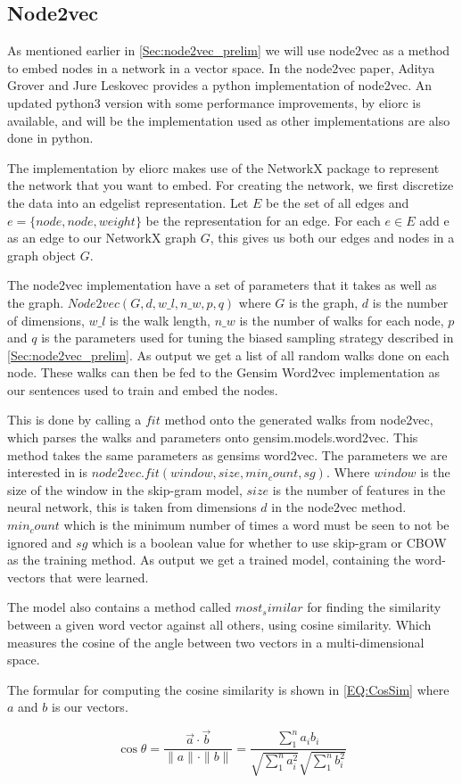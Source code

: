 \subsection{Node2vec}
\label{Sec:n2v_implementation}
As mentioned earlier in \ref{Sec:node2vec_prelim} we will use node2vec as a method to embed nodes in a network in a vector space. In the node2vec paper, Aditya Grover and Jure Leskovec provides a python implementation of node2vec. An updated python3 version with some performance improvements, by eliorc\cite{n2v.eliorc} is available, and will be the implementation used as other implementations are also done in python.

The implementation by eliorc makes use of the NetworkX package to represent the network that you want to embed. For creating the network, we first discretize the data into an edgelist representation. Let $E$ be the set of all edges and $e = \{node, node, weight\}$ be the representation for an edge. For each $e \in E$ add e as an edge to our NetworkX graph $G$, this gives us both our edges and nodes in a graph object $G$.

The node2vec implementation have a set of parameters that it takes as well as the graph. $Node2vec(G, d, w\_l, n\_w, p, q)$ where $G$ is the graph, $d$ is the number of dimensions, $w\_l$ is the walk length, $n\_w$ is the number of walks for each node, $p$ and $q$ is the parameters used for tuning the biased sampling strategy described in \ref{Sec:node2vec_prelim}. As output we get a list of all random walks done on each node. These walks can then be fed to the Gensim Word2vec\cite{Gensim.Word2vec} implementation as our sentences used to train and embed the nodes.

This is done by calling a $fit$ method onto the generated walks from node2vec, which parses the walks and parameters onto gensim.models.word2vec\cite{Gensim.Word2vec}. This method takes the same parameters as gensims word2vec. The parameters we are interested in is $node2vec.fit(window, size, min_count, sg)$. Where $window$ is the size of the window in the skip-gram model, $size$ is the number of features in the neural network, this is taken from dimensions $d$ in the node2vec method. $min_count$ which is the minimum number of times a word must be seen to not be ignored and $sg$ which is a boolean value for whether to use skip-gram or CBOW as the training method. As output we get a trained model, containing the word-vectors that were learned.

The model also contains a method called $most_similar$ for finding the similarity between a given word vector against all others, using cosine similarity. Which measures the cosine of the angle between two vectors in a multi-dimensional space.

The formular for computing the cosine similarity is shown in \ref{EQ:CosSim} where $a$ and $b$ is our vectors.

\begin{equation}\label{EQ:CosSim}
\cos\theta =
\frac{\vec{a}\cdot\vec{b}}{\parallel a\parallel
\cdot\parallel b\parallel} =
\frac{\sum_1^n a_i b_i}{\sqrt{\sum_1^n a_i^2}\sqrt{\sum_1^n b_i^2}}
\end{equation}
